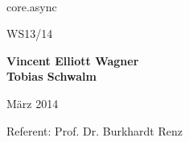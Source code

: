 \thispagestyle{empty}

\begin{center}


{\Huge \thetitle}\\

\vspace{20mm}
\begin{huge}
core.async
\end{huge}
\vspace{15mm}

\begin{Large}
WS13/14
\end{Large}

\vspace{15mm}
\begin{Large}
\textbf{Vincent Elliott Wagner}\\
\textbf{Tobias Schwalm}\\
\end{Large}
\vspace{15mm}
\begin{large}
März 2014
\end{large}

\vspace{15mm}
\begin{large}
Referent: Prof. Dr. Burkhardt Renz\\
\end{large}

\end{center}